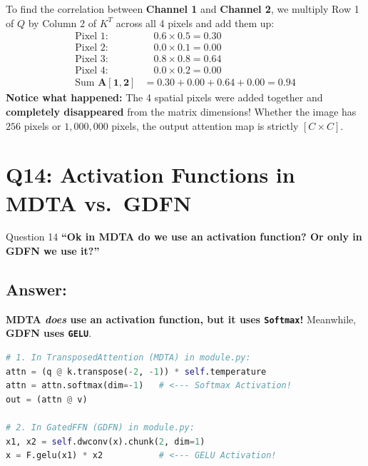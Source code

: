 \documentclass[11pt,a4paper]{article}
\begin{document}
To find the correlation between \textbf{Channel 1} and \textbf{Channel 2}, we multiply Row 1 of $Q$ by Column 2 of $K^T$ across all 4 pixels and add them up:
\begin{align*}
\text{Pixel 1:} &\quad 0.6 \times 0.5 = 0.30 \\
\text{Pixel 2:} &\quad 0.0 \times 0.1 = 0.00 \\
\text{Pixel 3:} &\quad 0.8 \times 0.8 = 0.64 \\
\text{Pixel 4:} &\quad 0.0 \times 0.2 = 0.00 \\
\hline
\text{Sum } \mathbf{A[1, 2]} &= 0.30 + 0.00 + 0.64 + 0.00 = \mathbf{0.94}
\end{align*}
\textbf{Notice what happened:} The 4 spatial pixels were added together and \textbf{completely disappeared} from the matrix dimensions! Whether the image has $256$ pixels or $1,000,000$ pixels, the output attention map is strictly $[C \times C]$.

\bigskip

\section{Q14: Activation Functions in MDTA vs.\ GDFN}

\begin{questionbox}{Question 14}
\textbf{``Ok in MDTA do we use an activation function? Or only in GDFN we use it?''}
\end{questionbox}

\subsection*{Answer:}
\textbf{MDTA \textit{does} use an activation function, but it uses \texttt{Softmax}!} Meanwhile, \textbf{GDFN uses \texttt{GELU}}.

\begin{lstlisting}[language=Python]
# 1. In TransposedAttention (MDTA) in module.py:
attn = (q @ k.transpose(-2, -1)) * self.temperature
attn = attn.softmax(dim=-1)   # <--- Softmax Activation!
out = (attn @ v)

# 2. In GatedFFN (GDFN) in module.py:
x1, x2 = self.dwconv(x).chunk(2, dim=1)
x = F.gelu(x1) * x2           # <--- GELU Activation!
\end{lstlisting}
\end{document}
